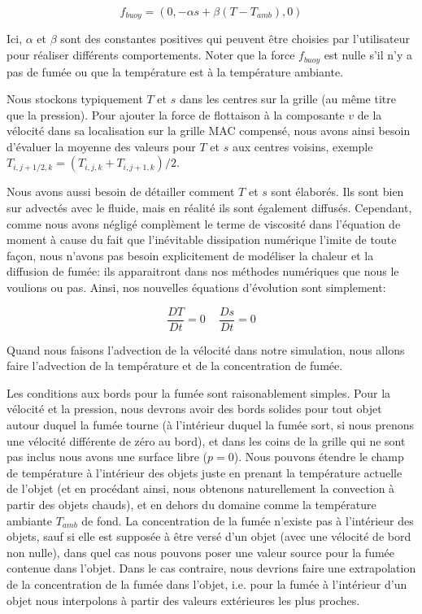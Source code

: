\documentclass[11pt]{report}
\begin{document}
\begin{equation}
f_{buoy} = (0, -\alpha s + \beta (T-T_{amb}) ,0)
\end{equation}

Ici, $\alpha$ et $\beta$ sont des constantes positives qui peuvent être choisies par l'utilisateur pour réaliser différents comportements. Noter que la force $f_{buoy}$ est nulle s'il n'y a pas de fumée ou que la température est à la température ambiante.\newline

Nous stockons typiquement $T$ et $s$ dans les centres sur la grille (au même titre que la pression). Pour ajouter la force de flottaison à la composante $v$ de la vélocité dans sa localisation sur la grille MAC compensé, nous avons ainsi besoin d'évaluer la moyenne des valeurs pour $T$ et $s$ aux centres voisins, exemple $T_{i, j+1/2, k} = (T_{i,j,k} + T_{i,j+1,k})/2$.\newline

Nous avons aussi besoin de détailler comment $T$ et $s$ sont élaborés. Ils sont bien sur advectés avec le fluide, mais en réalité ils sont également diffusés. Cependant, comme nous avons négligé complèment le terme de viscosité dans l'équation de moment à cause du fait que l'inévitable dissipation numérique l'imite de toute façon, nous n'avons pas besoin explicitement de modéliser la chaleur et la diffusion de fumée: ils apparaitront dans nos méthodes numériques que nous le voulions ou pas. Ainsi, nos nouvelles équations d'évolution sont simplement:

\begin{equation}
\frac{DT}{Dt} = 0 \,\,\,\,\,\,\, \frac{Ds}{Dt} = 0
\end{equation}

Quand nous faisons l'advection de la vélocité dans notre simulation, nous allons faire l'advection de la température et de la concentration de fumée.

Les conditions aux bords pour la fumée sont raisonablement simples. Pour la vélocité et la pression, nous devrons avoir des bords solides pour tout objet autour duquel la fumée tourne (à l'intérieur duquel la fumée sort, si nous prenons une vélocité différente de zéro au bord), et dans les coins de la grille qui ne sont pas inclus nous avons une surface libre ($p=0$). Nous pouvons étendre le champ de température à l'intérieur des objets juste en prenant la température actuelle de l'objet (et en procédant ainsi, nous obtenons naturellement la convection à partir des objets chauds), et en dehors du domaine comme la température ambiante $T_{amb}$ de fond. La concentration de la fumée n'existe pas à l'intérieur des objets, sauf si elle est supposée à être versé d'un objet (avec une vélocité de bord non nulle), dans quel cas nous pouvons poser une valeur source pour la fumée contenue dans l'objet. Dans le cas contraire, nous devrions faire une extrapolation de la concentration de la fumée dans l'objet, i.e. pour la fumée à l'intérieur d'un objet nous interpolons à partir des valeurs extérieures les plus proches.\newline
\end{document}
